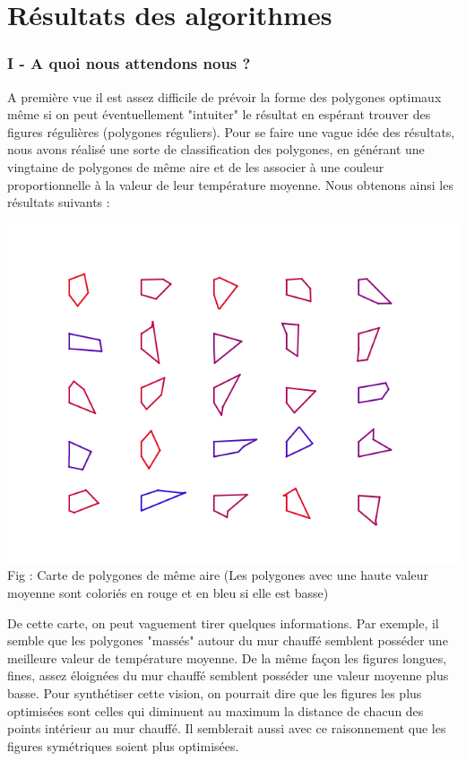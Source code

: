\documentclass[a4paper,reqno]{article}
\newcommand{\pa}{\hspace{1cm}}
\begin{document}
\newpage

\part{Résultats des algorithmes}


\section*{I - A quoi nous attendons nous ?}

\pa A première vue il est assez difficile de prévoir la forme des polygones optimaux même si on peut éventuellement "intuiter" le résultat en espérant trouver des figures régulières (polygones réguliers). Pour se faire une vague idée des résultats, nous avons réalisé une sorte de classification des polygones, en générant une vingtaine de polygones de même aire et de les associer à une couleur proportionnelle à la valeur de leur température moyenne. Nous obtenons ainsi les résultats suivants : \\

\begin{center}
	\includegraphics[scale=0.9]{Figure_3.png}
	Fig : Carte de polygones de même aire (Les polygones avec une haute valeur moyenne sont coloriés en rouge et en bleu si elle est basse)\\
\end{center}

\par De cette carte, on peut vaguement tirer quelques informations. Par exemple, il semble que les polygones "massés" autour du mur chauffé semblent posséder une meilleure valeur de température moyenne. De la même façon les figures longues, fines, assez éloignées du mur chauffé semblent posséder une valeur moyenne plus basse. Pour synthétiser cette vision, on pourrait dire que les figures les plus optimisées sont celles qui diminuent au maximum la distance de chacun des points intérieur au mur chauffé. Il semblerait aussi avec ce raisonnement que les figures symétriques soient plus optimisées.\\
\end{document}
